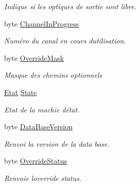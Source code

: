 \begin{DoxyCompactItemize}
\begin{DoxyCompactList}\small\item\em Indique si les optiques de sortie sont libre. \end{DoxyCompactList}\item 
byte \mbox{\hyperlink{class_device_library_1_1_c_coin_validator_a31cbd99fe83d5483df49f401350c8a45}{Channel\+In\+Progress}}
\begin{DoxyCompactList}\small\item\em Numéro du canal en cours d\textquotesingle{}utilisation. \end{DoxyCompactList}\item 
byte \mbox{\hyperlink{class_device_library_1_1_c_coin_validator_a065e536f9d47a78ab3bbc5fd2990ada0}{Override\+Mask}}
\begin{DoxyCompactList}\small\item\em Masque des chemins optionnels \end{DoxyCompactList}\item 
\mbox{\hyperlink{class_device_library_1_1_c_coin_validator_a33c79ff59c961c2e1bbf95838e5d6871}{Etat}} \mbox{\hyperlink{class_device_library_1_1_c_coin_validator_a38527f741c0cee761a37bff50bafbd20}{State}}
\begin{DoxyCompactList}\small\item\em Etat de la machie d\textquotesingle{}état. \end{DoxyCompactList}\item 
byte \mbox{\hyperlink{class_device_library_1_1_c_coin_validator_a8e3e78f989d6549af291def41d6f2498}{Data\+Base\+Version}}
\begin{DoxyCompactList}\small\item\em Renvoi la version de la data base. \end{DoxyCompactList}\item 
byte \mbox{\hyperlink{class_device_library_1_1_c_coin_validator_a6febc69e244b62d2527286c2483f5a66}{Override\+Status}}
\begin{DoxyCompactList}\small\item\em Renvoie l\textquotesingle{}override status. \end{DoxyCompactList}\item 

\end{DoxyCompactItemize}

